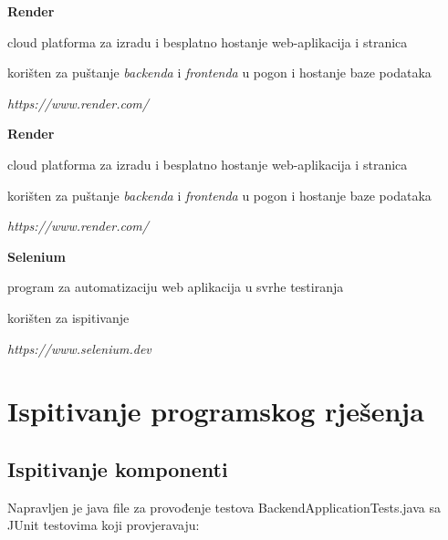 \begin{packed_item}
				\item \textbf{Render}
				\begin{packed_item}
					\item cloud platforma za izradu i besplatno hostanje web-aplikacija i stranica
					\item korišten za puštanje \textit{backenda} i \textit{frontenda} u pogon i hostanje baze podataka
					\item \textit{https://www.render.com/}
				\end{packed_item}

				\item \textbf{Render}
				\begin{packed_item}
					\item cloud platforma za izradu i besplatno hostanje web-aplikacija i stranica
					\item korišten za puštanje \textit{backenda} i \textit{frontenda} u pogon i hostanje baze podataka
					\item \textit{https://www.render.com/}
				\end{packed_item}

				\item \textbf{Selenium}
				\begin{packed_item}
					\item program za automatizaciju web aplikacija u svrhe testiranja
					\item korišten za ispitivanje
					\item \textit{https://www.selenium.dev}
				\end{packed_item}
			\end{packed_item}
			

			 \eject 
		
	
		\section{Ispitivanje programskog rješenja}
			
			\subsection{Ispitivanje komponenti}
			Napravljen je java file za provođenje testova BackendApplicationTests.java sa JUnit testovima koji provjeravaju:

